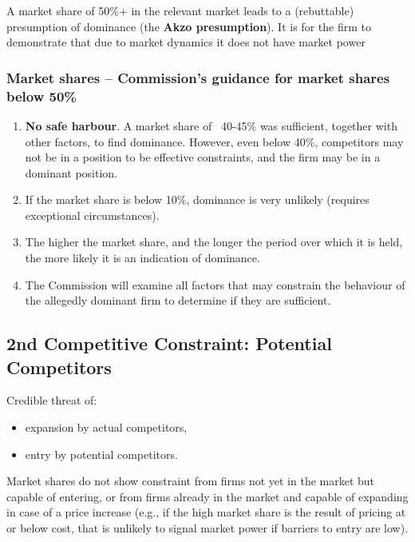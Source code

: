             A market share of 50\%+ in the relevant market leads to a (rebuttable) presumption of dominance (the \textbf{Akzo presumption}).
            It is for the firm to demonstrate that due to market dynamics it does not have market power

        \subsubsection{Market shares – Commission’s guidance for market shares below 50\%}

            \begin{enumerate}[label=\roman*.]
                \item \textbf{No safe harbour}. A market share of ~40-45\% was sufficient, together with other factors, to find dominance. However, even below 40\%, competitors may not be in a position to be effective constraints, and the firm may be in a dominant position.
                \item If the market share is below 10\%, dominance is very unlikely (requires exceptional circumstances).
                \item The higher the market share, and the longer the period over which it is held, the more likely it is an indication of dominance.
                \item The Commission will examine all factors that may constrain the behaviour of the allegedly dominant firm to determine if they are sufficient.
            \end{enumerate}

    \subsection{2nd Competitive Constraint: Potential Competitors}

        Credible threat of:
            \begin{itemize}
                \item expansion by actual competitors,
                \item entry by potential competitors.
            \end{itemize}
        
        Market shares do not show constraint from firms not yet in the market but capable of entering, or from firms already in the market and capable of expanding in case of a price increase (e.g., if the high market share is the result of pricing at or below cost, that is unlikely to signal market power if barriers to entry are low).

